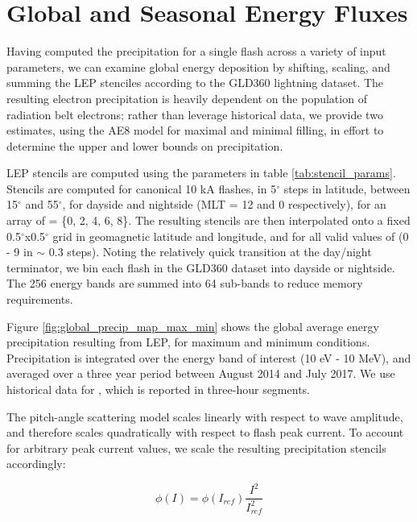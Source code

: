 

\section{Global and Seasonal Energy Fluxes}

Having computed the precipitation for a single flash across a variety of input parameters, we can examine global energy deposition by shifting, scaling, and summing the LEP stenciles according to the GLD360 lightning dataset. The resulting electron precipitation is heavily dependent on the population of radiation belt electrons; rather than leverage historical data, we provide two estimates, using the AE8 model for maximal and minimal filling, in effort to determine the upper and lower bounds on precipitation. 

LEP stencils are computed using the parameters in table \ref{tab:stencil_params}. Stencils are computed for canonical 10 kA flashes, in 5$^\circ$ steps in latitude, between 15$^\circ$ and 55$^\circ$, for dayside and nightside (MLT = 12 and 0 respectively), for an array of \kp{} = \{0, 2, 4, 6, 8\}. The resulting stencils are then interpolated onto a fixed 0.5$^\circ$x0.5$^\circ$ grid in geomagnetic latitude and longitude, and for all valid values of \kp{} (0 - 9 in $\sim$ 0.3 steps). Noting the relatively quick transition at the day/night terminator, we bin each flash in the GLD360 dataset into dayside or nightside. The 256 energy bands are summed into 64 sub-bands to reduce memory requirements. 

Figure \ref{fig:global_precip_map_max_min} shows the global average energy precipitation resulting from LEP, for maximum and minimum conditions. Precipitation is integrated over the energy band of interest (10 eV - 10 MeV), and averaged over a three year period between August 2014 and July 2017. We use historical data for \kp{}, which is reported in three-hour segments.

The pitch-angle scattering model scales linearly with respect to wave amplitude, and therefore scales quadratically with respect to flash peak current. To account for arbitrary peak current values, we scale the resulting precipitation stencils accordingly:

\begin{equation}
\phi(I) = \phi(I_{ref})\frac{I^2}{I_{ref}^2} 
\end{equation}

